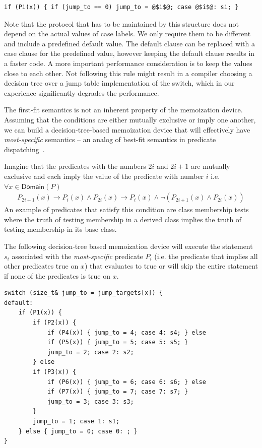 \begin{lstlisting}
if (Pi(x)) { if (jump_to == 0) jump_to = @$i$@; case @$i$@: si; }
\end{lstlisting}

\noindent
Note that the protocol that has to be maintained by this structure does not 
depend on the actual values of case labels. We only require them to be 
different and include a predefined default value. The default clause can be 
replaced with a case clause for the predefined value, however keeping the default  
clause results in a faster code. A more important performance consideration is to 
keep the values close to each other. Not following this rule might result in a 
compiler choosing a decision tree over a jump table implementation of the 
switch, which in our experience significantly degrades the performance.

The first-fit semantics is not an inherent property of the memoization device. 
Assuming that the conditions are either mutually exclusive or imply one another, we 
can build a decision-tree-based memoization device that will effectively have 
\emph{most-specific} semantics -- an analog of best-fit semantics in predicate 
dispatching~\cite{ErnstKC98}.

Imagine that the predicates with the numbers $2i$ and $2i+1$ are mutually exclusive and 
each imply the value of the predicate with number $i$ i.e. $\forall x \in \mathsf{Domain}(P)$
\begin{eqnarray*}
P_{2i+1}(x)\rightarrow P_i(x) \wedge P_{2i}(x)\rightarrow P_i(x) \wedge \neg(P_{2i+1}(x) \wedge P_{2i}(x))
\end{eqnarray*}
\noindent
An example of predicates that satisfy this condition are class membership tests 
where the truth of testing membership in a derived class implies the truth of 
testing membership in its base class. 

The following decision-tree based memoization device will execute the statement 
$s_i$ associated with the \emph{most-specific} predicate $P_i$ (i.e. the 
predicate that implies all other predicates true on $x$) that evaluates to true 
or will skip the entire statement if none of the predicates is true on $x$.

\begin{lstlisting}
switch (size_t& jump_to = jump_targets[x]) {
default:
    if (P1(x)) {
        if (P2(x)) {
            if (P4(x)) { jump_to = 4; case 4: s4; } else
            if (P5(x)) { jump_to = 5; case 5: s5; } 
            jump_to = 2; case 2: s2;
        } else
        if (P3(x)) {
            if (P6(x)) { jump_to = 6; case 6: s6; } else
            if (P7(x)) { jump_to = 7; case 7: s7; } 
            jump_to = 3; case 3: s3;
        }
        jump_to = 1; case 1: s1;
    } else { jump_to = 0; case 0: ; }
}
\end{lstlisting}

